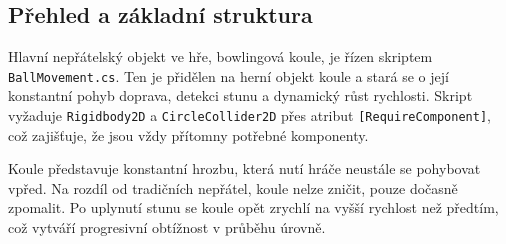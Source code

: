 \subsection{Přehled a základní struktura}

Hlavní nepřátelský objekt ve hře, bowlingová koule, je řízen skriptem \texttt{BallMovement.cs}. Ten je přidělen na herní objekt koule a stará se o její konstantní pohyb doprava, detekci stunu a dynamický růst rychlosti. Skript vyžaduje \texttt{Rigidbody2D} a \texttt{CircleCollider2D} přes atribut \texttt{[RequireComponent]}, což zajišťuje, že jsou vždy přítomny potřebné komponenty.

Koule představuje konstantní hrozbu, která nutí hráče neustále se pohybovat vpřed. Na rozdíl od tradičních nepřátel, koule nelze zničit, pouze dočasně zpomalit. Po uplynutí stunu se koule opět zrychlí na vyšší rychlost než předtím, což vytváří progresivní obtížnost v průběhu úrovně.